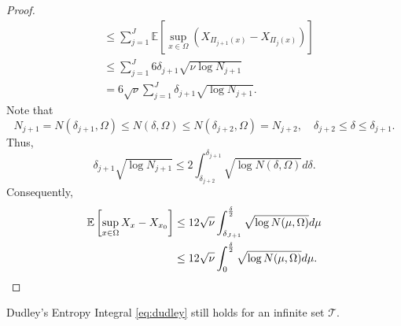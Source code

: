 \begin{proof}
\begin{equation}
\begin{split}
&\le \sum_{j=1}^J \mathbb{E}\left [ \sup_{x\in \Omega} (X_{\Pi_{j+1} (x)} - X_{\Pi_j (x)})\right]
\\
&\le \sum_{j=1}^J 6\delta_{j+1}\sqrt{\nu \log N_{j+1}}
\\
& = 6\sqrt{\nu}\sum_{j=1}^J \delta_{j+1}\sqrt{\log N_{j+1}}.
\end{split}
\end{equation}
Note that 
\begin{equation}
N_{j+1}=N(\delta_{j+1}, \Omega)\le N(\delta, \Omega) \le N(\delta_{j+2}, \Omega)=N_{j+2},\quad \delta_{j+2}\le \delta \le \delta_{j+1}.
\end{equation}
Thus,
\begin{equation}
\delta_{j+1}\sqrt{\log N_{j+1}}\le 2\int^{\delta_{j+1}}_{\delta_{j+2}} \sqrt{ \log N(\delta, \Omega) }d\delta.
\end{equation}
Consequently,
\begin{equation}
\begin{split}
\mathbb{E}\left [ \sup_{x\in \Omega} X_x - X_{x_0}\right]
&\le 12\sqrt{\nu} \int^{\delta\over 2}_{\delta_{J+1}}\sqrt{\log N(\mu, \Omega) }d\mu
\\
&\le 12\sqrt{\nu} \int^{\delta\over 2}_{0}\sqrt{\log N(\mu, \Omega) }d\mu.
\end{split}
\end{equation}
\end{proof}
\begin{remark}
Dudley's Entropy Integral \eqref{eq:dudley} still holds for an infinite set $\mathcal{T}$.
\end{remark}

